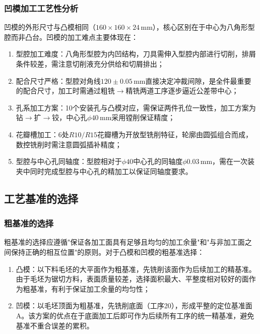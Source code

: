 \documentclass{xautCADreport}
\begin{document}
\subsubsection{凹模加工工艺性分析}

凹模的外形尺寸与凸模相同（$160\times160\times24\,\mathrm{mm}$），核心区别在于中心为八角形型腔而非凸台。凹模的加工难点主要体现在：

\begin{enumerate}
  \item 型腔加工难度：八角形型腔为内凹结构，刀具需伸入型腔内部进行切削，排屑条件较差，需注意切削液充分供给和切屑排出；
  \item 配合尺寸严格：型腔对角线$120\pm0.05\,\mathrm{mm}$直接决定冲裁间隙，是全件最重要的配合尺寸，加工时需通过粗铣$\to$精铣两道工序逐步逼近公差带中心；
  \item 孔系加工方案：10个安装孔与凸模对应，需保证两件孔位一致性，加工方案为钻$\to$扩$\to$铰，中心孔$\phi40\,\mathrm{mm}$采用镗削保证精度；
  \item 花瓣槽加工：6处$R10/R15$花瓣槽为开放型铣削特征，轮廓由圆弧组合而成，数控铣削时需注意圆弧插补精度；
  \item 型腔与中心孔同轴度：型腔相对于$\phi40$中心孔的同轴度$\phi0.03\,\mathrm{mm}$，需在一次装夹中同时完成型腔与中心孔的精加工以保证同轴度要求。
\end{enumerate}

\subsection{工艺基准的选择}

\subsubsection{粗基准的选择}

粗基准的选择应遵循"保证各加工面具有足够且均匀的加工余量"和"与非加工面之间保持正确的相互位置"的原则。对于凸模和凹模的粗基准选择：

\begin{enumerate}
  \item 凸模：以下料毛坯的大平面作为粗基准，先铣削该面作为后续加工的精基准。由于毛坯为锯切方料，表面质量较差，选择面积最大、平整度相对较好的面作为粗基准，有利于保证加工余量的均匀性；
  \item 凹模：以毛坯顶面为粗基准，先铣削底面（工序20），形成平整的定位基准面A。该方案的优点在于底面加工后即可作为后续所有工序的统一精基准，避免基准不重合误差的累积。
\end{enumerate}
\end{document}
